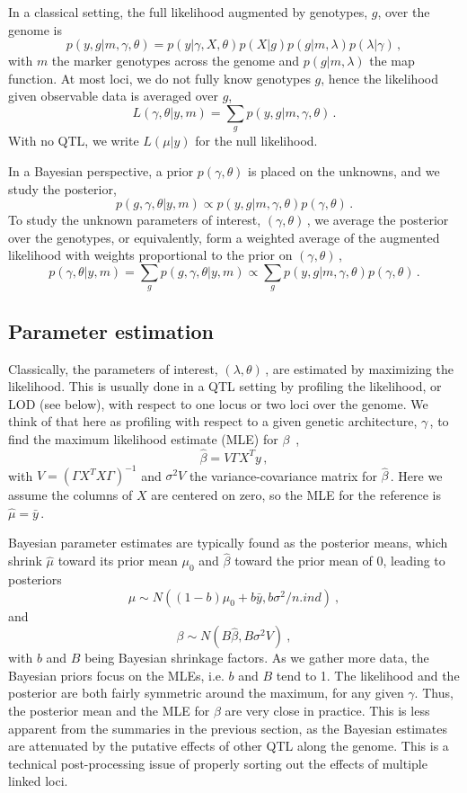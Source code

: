 \documentclass[12pt]{article}
\begin{document}
In a classical setting, the full likelihood augmented by genotypes,
$g$, over the genome is
$$
p(y,g\vert m, \gamma, \theta) =
p(y\vert \gamma, X, \theta)p(X\vert g)
p(g\vert m, \lambda)p(\lambda\vert\gamma)\,,
$$
with $m$ the marker genotypes across the genome and
$p(g\vert m, \lambda)$ the map function. At most loci, we do not fully
know genotypes $g$, hence the likelihood given observable data is
averaged over $g$,
$$
L(\gamma,\theta\vert y,m) =
\sum_g p(y,g\vert m, \gamma, \theta)\,.
$$
With no QTL, we write $L(\mu\vert y)$ for the null likelihood.

In a Bayesian perspective, a prior $p(\gamma,\theta)$ is placed on
the unknowns, and we study the posterior,
$$
p(g,\gamma, \theta\vert y,m ) \propto
p(y,g\vert m, \gamma, \theta)p(\gamma,\theta)\,.
$$
To study the unknown parameters of interest, $(\gamma, \theta)$\,, we
average the posterior over the genotypes, or equivalently, form a
weighted average of the augmented likelihood with weights proportional
to the prior on $(\gamma, \theta)$\,,
$$
p(\gamma, \theta\vert y,m ) = \sum_g p(g,\gamma, \theta\vert y,m )
\propto
\sum_g p(y,g\vert m, \gamma, \theta)p(\gamma,\theta)\,.
$$

\subsection{Parameter estimation}

Classically, the parameters of interest, $(\lambda, \theta)$\,, are
estimated by maximizing the likelihood. This is usually done in a QTL
setting by profiling the likelihood, or LOD (see below), with respect
to one locus or two loci over the genome. We think of that here as
profiling with respect to a given genetic architecture, $\gamma$\,, to
find the maximum likelihood estimate (MLE) for $\beta$ \,,
$$
\hat{\beta} = V\Gamma X^T y\,,
$$
with $V = (\Gamma X^T X \Gamma)^{-1}$ and $\sigma^2V$ the
variance-covariance matrix for $\hat{\beta}$\,. Here we assume the
columns of $X$ are centered on zero, so the MLE for the reference is
$\hat{\mu} = \bar{y}$\,.

Bayesian parameter estimates are typically found as the posterior
means, which shrink $\hat{\mu}$ toward its prior mean $\mu_0$ and
$\hat{\beta}$ toward the prior mean of 0, leading to posteriors
$$
\mu\sim N\left((1-b)\mu_0 +b\bar{y}, b\sigma^2/n.ind\right)~,
$$
and
$$
\beta\sim N\left(B\hat{\beta}, B\sigma^2V\right)~,
$$
with $b$ and $B$ being Bayesian shrinkage factors.  As we 
gather more data, the Bayesian priors focus on the MLEs, i.e. $b$ and
$B$ tend to 1. The likelihood and the posterior are both
fairly symmetric around the maximum, for any given $\gamma$. Thus, the
posterior mean and the MLE for $\beta$ are
very close in practice. This is less apparent from the summaries in
the previous section, as the Bayesian estimates are attenuated by the
putative effects of other QTL along the genome. This is a technical
post-processing issue of properly sorting out the effects of multiple
linked loci.
\end{document}
